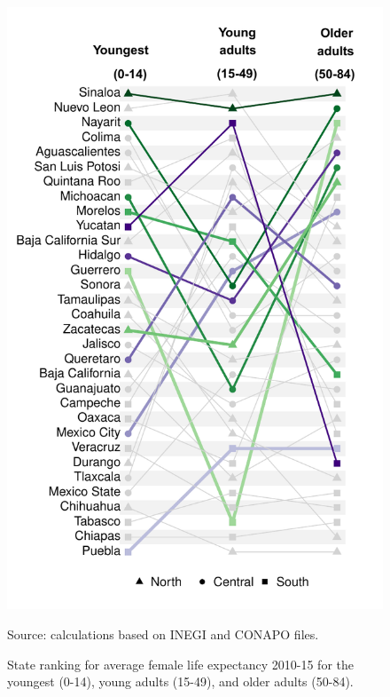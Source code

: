 \documentclass[11.5pt]{article}
\begin{document}
{\begin{figure}[h!]
\centering
\caption{State ranking for average female life expectancy 2010-15 for the youngest (0-14), young adults (15-49), and older adults (50-84).}
\label{rankFemales}
\includegraphics[scale=.50]{RankFemales.pdf}

Source: calculations based on INEGI and CONAPO files. 
\end{figure}

}
\end{document}
